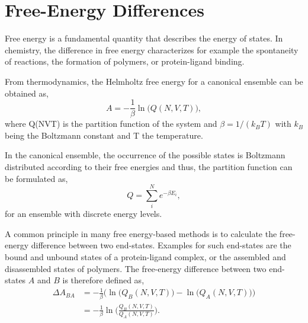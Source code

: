 \section{Free-Energy Differences}
Free energy is a fundamental quantity that describes the energy of states. In chemistry, the difference in free energy characterizes for example the spontaneity of reactions, the formation of polymers, or protein-ligand binding.\cite{Kollman1993, Armacost2020, Christ2009, Hansen2014, Cournia2020} 

From thermodynamics, the Helmholtz free energy\cite{Helmholtz1882} for a canonical ensemble can be obtained as, 
\begin{equation}
    A =  -\frac{1}{\beta} \ln\Big(Q(N, V, T)\Big),
\end{equation}
where Q(NVT) is the partition function of the system and $\beta = 1/(k_B T)$ with $k_B$ being the Boltzmann constant and T the temperature. \cite{Atkins2014}

In the canonical ensemble, the occurrence of the possible states is Boltzmann distributed \cite{Boltzmann1872} according to their free energies and thus, the partition function can be formulated as,
\begin{equation}
    Q =\sum^N_i e^{-\beta E_i} ,
\end{equation} 
for an ensemble with discrete energy levels.  \cite{Atkins2014}

A common principle in many free energy-based methods is to calculate the free-energy difference between two end-states. \cite{Ytreberg2006, Kirkwood1935, Zwanzig1954} Examples for such end-states are the bound and unbound states of a protein-ligand complex, or the assembled and disassembled states of polymers. \cite{Kollman1993, Armacost2020, Christ2009, Hansen2014, Cournia2020} 
%
The free-energy difference between two end-states $A$ and $B$ is therefore defined as,  \cite{Atkins2014}
\begin{equation}
    \begin{split}
        \Delta A_{BA} &= -\frac{1}{\beta} \bigg(\ln\big( Q_B(N, V, T) ) - \ln(Q_A(N, V, T)\big)\bigg)\\
        &= -\frac{1}{\beta} \ln\Bigg(\frac{Q_B(N, V, T)}{Q_A(N, V, T)}\Bigg).
    \end{split}
\end{equation}

